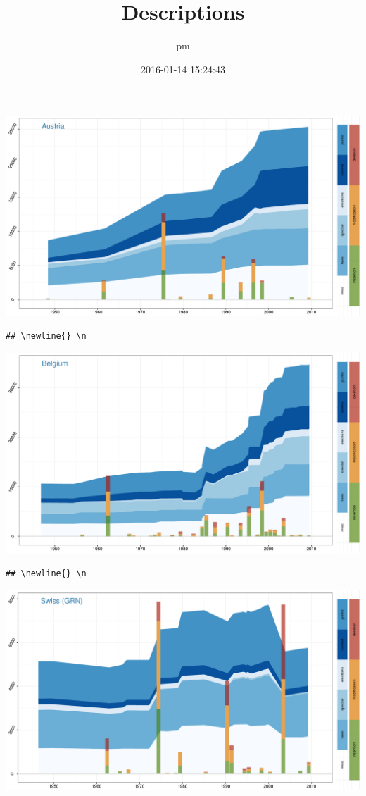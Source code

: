 \documentclass[a4paper, landscape]{article}
\title{Descriptions}
\author{pm}
\date{2016-01-14 15:24:43}
\begin{document}
\maketitle

\pagebreak{}

\includegraphics{country_graphs_files/figure-latex/unnamed-chunk-3-1.pdf}\\

\begin{verbatim}
## \newline{} \n
\end{verbatim}

\includegraphics{country_graphs_files/figure-latex/unnamed-chunk-3-2.pdf}\\

\begin{verbatim}
## \newline{} \n
\end{verbatim}

\includegraphics{country_graphs_files/figure-latex/unnamed-chunk-3-3.pdf}\\
\end{document}
